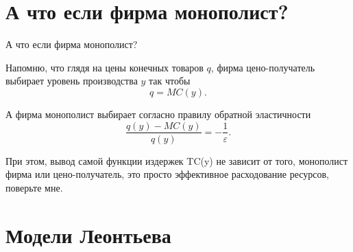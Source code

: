 \documentclass{beamer}
\begin{document}
\section{А что если фирма монополист?}

\begin{frame}{А что если фирма монополист?}

Напомню, что глядя на цены конечных товаров $q$, фирма цено-получатель выбирает уровень производства $y$ так чтобы $$q = MC(y).$$ 

А фирма монополист выбирает согласно правилу обратной эластичности
$$ \frac{q(y)-MC(y)}{q(y)} = - \frac{1}{\varepsilon}.$$

При этом, вывод самой функции издержек TC(y) не зависит от того, монополист фирма или цено-получатель, это просто эффективное расходование ресурсов, поверьте мне.

\end{frame}

\section{Модели Леонтьева}
\end{document}
